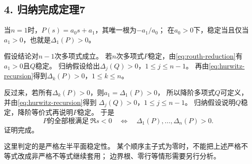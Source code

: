 \subsection*{4. 归纳完成定理7}

当$n=1$时，$P(s)=a_0s+a_1$，其唯一根为$-a_1/a_0$；
在$a_0>0$下，稳定当且仅当$a_1>0$，也就是$\Delta_1(P)>0$。

假设结论对$n-1$次多项式成立。
若$n$次多项式$P$稳定，由\eqref{eq:routh-reduction}有$a_1>0$且$Q$稳定。
归纳假设给出$\Delta_j(Q)>0$，$1\le j\le n-1$。
再由\eqref{eq:hurwitz-recursion}得到$\Delta_k(P)>0$，$1\le k\le n$。

反过来，若所有$\Delta_k(P)>0$，则$a_1=\Delta_1(P)>0$，
所以降阶多项式$Q$可定义，并由\eqref{eq:hurwitz-recursion}得到
$\Delta_j(Q)>0$，$1\le j\le n-1$。
归纳假设说明$Q$稳定，降阶等价式再说明$P$稳定。
于是
\[
 \boxed{\quad P\text{的全部根满足}\ \Re s<0
 \quad\Longleftrightarrow\quad
 \Delta_1(P),\ldots,\Delta_n(P)>0.\quad}
\]
证明完成。

这里判定的是严格左半平面稳定性。
某个顺序主子式为零时，不能把上述严格不等式改成非严格不等式继续套用；
边界根、零行等情形需要另行分析。
